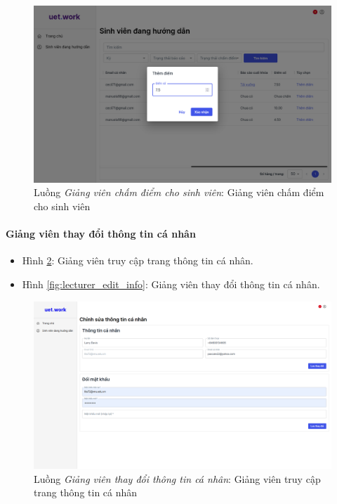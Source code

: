\documentclass[./../main.tex]{subfiles}
\begin{document}
\begin{figure}[]
	\includegraphics[width=\linewidth]{./images/image65.png}
	\caption{Luồng \emph{Giảng viên chấm điểm cho sinh viên}: Giảng viên chấm điểm cho sinh viên}
	\label{fig:lecturer_score}
\end{figure}

\paragraph*{Giảng viên thay đổi thông tin cá nhân}

\begin{itemize}
	\item Hình \ref{fig:lecturer_access_info_page}: Giảng viên truy cập trang thông tin cá nhân. 
	\item Hình \ref{fig:lecturer_edit_info}: Giảng viên thay đổi thông tin cá nhân.
\end{itemize}

\begin{figure}[]
	\includegraphics[width=\linewidth]{./images/image51.png}
	\caption{Luồng \emph{Giảng viên thay đổi thông tin cá nhân}: Giảng viên truy cập trang thông tin cá nhân}
	\label{fig:lecturer_access_info_page}
\end{figure}
\end{document}
